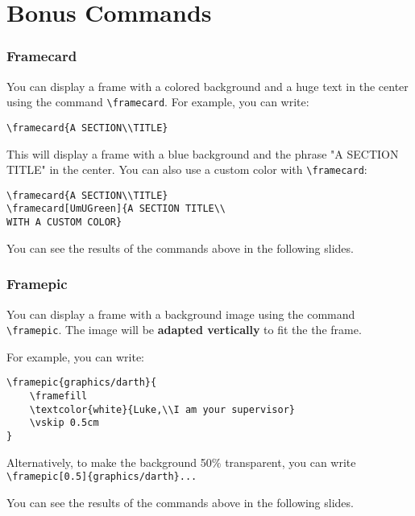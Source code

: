 \documentclass[usenames,dvipsnames,10pt]{beamer}
\newcommand{\framefill}{\vskip0pt plus 1filll}
\begin{document}
\section{Bonus Commands}

\begin{frame}[fragile]
\frametitle{Framecard}

You can display a frame with a colored background and a huge text in the center using the command \texttt{\textbackslash framecard}.
\vskip 0.5cm 
For example, you can write:
\begin{verbatim}
\framecard{A SECTION\\TITLE}
\end{verbatim}

This will display a frame with a blue background and the phrase "A SECTION TITLE" in the center. You can also use a custom color with \texttt{\textbackslash framecard}:
\begin{verbatim}
\framecard{A SECTION\\TITLE}
\framecard[UmUGreen]{A SECTION TITLE\\
WITH A CUSTOM COLOR}
\end{verbatim}
You can see the results of the commands above in the following slides.

\end{frame}


\begin{frame}[fragile]
\frametitle{Framepic}

You can display a frame with a background image using the command \texttt{\textbackslash framepic}. The image will be \textbf{adapted vertically} to fit the the frame. 

For example, you can write:
\begin{verbatim}
\framepic{graphics/darth}{
	\framefill
    \textcolor{white}{Luke,\\I am your supervisor}
    \vskip 0.5cm
}
\end{verbatim}

Alternatively, to make the background 50\% transparent, you can write \texttt{\textbackslash framepic[0.5]\{graphics/darth\}...}


You can see the results of the commands above in the following slides.

\end{frame}
\end{document}
